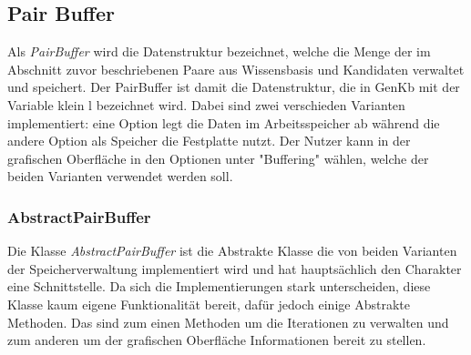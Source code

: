 \documentclass[12pt,a4paper]{article}
\begin{document}
\subsection{Pair Buffer}
\label{sec:pairbuffer}


Als \textit{PairBuffer} wird die Datenstruktur bezeichnet, welche die Menge der im Abschnitt zuvor beschriebenen Paare aus Wissensbasis und Kandidaten verwaltet und speichert. Der PairBuffer ist damit die Datenstruktur, die in GenKb mit der Variable klein l bezeichnet wird. Dabei sind zwei verschieden Varianten implementiert: eine Option legt die Daten im Arbeitsspeicher ab während die andere Option als Speicher die Festplatte nutzt. Der Nutzer kann in der grafischen Oberfläche in den Optionen unter "Buffering" \space wählen, welche der beiden Varianten verwendet werden soll.

\subsubsection{AbstractPairBuffer}
Die Klasse \textit{AbstractPairBuffer} ist die Abstrakte Klasse die von beiden Varianten der Speicherverwaltung implementiert wird und hat hauptsächlich den Charakter eine Schnittstelle. Da sich die Implementierungen stark unterscheiden, diese Klasse kaum eigene Funktionalität bereit, dafür jedoch einige Abstrakte Methoden. Das sind zum einen Methoden um die Iterationen zu verwalten und zum anderen um der grafischen Oberfläche Informationen bereit zu stellen. \\
\end{document}
